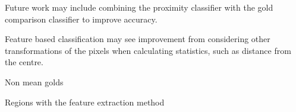 
Future work may include combining the proximity classifier with the gold 
comparison classifier to improve accuracy. 

Feature based classification may see improvement from considering other
transformations of the pixels when calculating statistics, such as distance
from the centre.

Non mean golds

Regions with the feature extraction method
